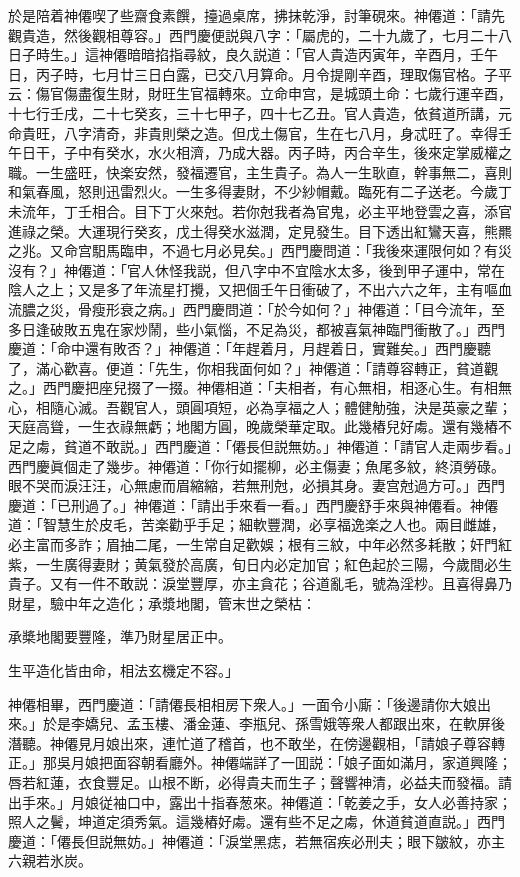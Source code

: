 於是陪着神僊喫了些齋食素饌，擡過桌席，拂抹乾淨，討筆硯來。神僊道：「請先觀貴造，然後觀相尊容。」西門慶便説與八字：「屬虎的，二十九歲了，七月二十八日子時生。」這神僊暗暗掐指尋紋，良久説道：「官人貴造丙寅年，辛酉月，壬午日，丙子時，七月廿三日白露，已交八月算命。月令提剛辛酉，理取傷官格。子平云：傷官傷盡復生財，財旺生官福轉來。立命申宫，是城頭土命：七歲行運辛酉，十七行壬戌，二十七癸亥，三十七甲子，四十七乙丑。官人貴造，依貧道所講，元命貴旺，八字清奇，非貴則榮之造。但戊土傷官，生在七八月，身忒旺了。幸得壬午日干，子中有癸水，水火相濟，乃成大器。丙子時，丙合辛生，後來定掌威權之職。一生盛旺，快楽安然，發福遷官，主生貴子。為人一生耿直，幹事無二，喜則和氣春風，怒則迅雷烈火。一生多得妻財，不少紗帽戴。臨死有二子送老。今歲丁未流年，丁壬相合。目下丁火來尅。若你尅我者為官鬼，必主平地登雲之喜，添官進祿之榮。大運現行癸亥，戊土得癸水滋潤，定見發生。目下透出紅鸞天喜，熊羆之兆。又命宫馹馬臨申，不過七月必見矣。」西門慶問道：「我後來運限何如？有災沒有？」神僊道：「官人休怪我説，但八字中不宜陰水太多，後到甲子運中，常在陰人之上；又是多了年流星打攪，又把個壬午日衝破了，不出六六之年，主有嘔血流膿之災，骨瘦形衰之病。」西門慶問道：「於今如何？」神僊道：「目今流年，至多日逢破敗五鬼在家炒鬧，些小氣惱，不足為災，都被喜氣神臨門衝散了。」西門慶道：「命中還有敗否？」神僊道：「年趕着月，月趕着日，實難矣。」西門慶聽了，滿心歡喜。便道：「先生，你相我面何如？」神僊道：「請尊容轉正，貧道觀之。」西門慶把座兒掇了一掇。神僊相道：「夫相者，有心無相，相逐心生。有相無心，相隨心滅。吾觀官人，頭圓項短，必為享福之人；體健觔強，決是英豪之輩；天庭高聳，一生衣祿無虧；地閣方圓，晚歲榮華定取。此幾樁兒好䖏。還有幾樁不足之䖏，貧道不敢説。」西門慶道：「僊長但説無妨。」神僊道：「請官人走兩步看。」西門慶眞個走了幾步。神僊道：「你行如擺柳，必主傷妻；魚尾多紋，終湏勞碌。眼不哭而淚汪汪，心無慮而眉縮縮，若無刑尅，必損其身。妻宫尅過方可。」西門慶道：「已刑過了。」神僊道：「請出手來看一看。」西門慶舒手來與神僊看。神僊道：「智慧生於皮毛，苦楽勸乎手足；細軟豐潤，必享福逸楽之人也。兩目雌雄，必主富而多詐；眉抽二尾，一生常自足歡娛；根有三紋，中年必然多耗散；奸門紅紫，一生廣得妻財；黄氣發於高廣，旬日内必定加官；紅色起於三陽，今歲間必生貴子。又有一件不敢説：淚堂豐厚，亦主貪花；谷道亂毛，號為淫杪。且喜得鼻乃財星，驗中年之造化；承漿地閣，管末世之榮枯：

\begin{myquote}
承槳地閣要豐隆，準乃財星居正中。

生平造化皆由命，相法玄機定不容。」
\end{myquote}

神僊相畢，西門慶道：「請僊長相相房下衆人。」一面令小廝：「後邊請你大娘出來。」於是李嬌兒、孟玉樓、潘金蓮、李瓶兒、孫雪娥等衆人都跟出來，在軟屏後潛聽。神僊見月娘出來，連忙道了稽首，也不敢坐，在傍邊觀相，「請娘子尊容轉正。」那吳月娘把面容朝看廳外。神僊端詳了一囬説：「娘子面如滿月，家道興隆；唇若紅蓮，衣食豐足。山根不断，必得貴夫而生子；聲響神清，必益夫而發福。請出手來。」月娘従袖口中，露出十指春葱來。神僊道：「乾姜之手，女人必善持家；照人之鬢，坤道定須秀氣。這幾樁好䖏。還有些不足之䖏，休道貧道直説。」西門慶道：「僊長但説無妨。」神僊道：「淚堂黑痣，若無宿疾必刑夫；眼下皺紋，亦主六親若氷炭。

